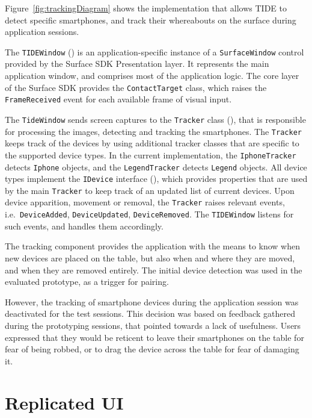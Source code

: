 Figure~\ref{fig:trackingDiagram} shows the implementation that allows TIDE to detect specific smartphones, and track their whereabouts on the surface during application sessions.

The \texttt{TIDEWindow} () is an application-specific instance of a \texttt{SurfaceWindow} control provided by the Surface SDK Presentation layer. 
It represents the main application window, and comprises most of the application logic.
The core layer of the Surface SDK provides the \texttt{ContactTarget} class, which raises the \texttt{FrameReceived} event for each available frame of visual input.

The \texttt{TideWindow} sends screen captures to the \texttt{Tracker} class (), that is responsible for processing the images, detecting and tracking the smartphones.
The \texttt{Tracker} keeps track of the devices by using additional tracker classes that are specific to the supported device types.
In the current implementation, the \texttt{IphoneTracker} detects \texttt{Iphone} objects, and the \texttt{LegendTracker} detects \texttt{Legend} objects.
All device types implement the \texttt{IDevice} interface (), which provides properties that are used by the main \texttt{Tracker} to keep track of an updated list of current devices.
Upon device apparition, movement or removal, the \texttt{Tracker} raises relevant events, i.e.\ \texttt{DeviceAdded}, \texttt{DeviceUpdated}, \texttt{DeviceRemoved}.
The \texttt{TIDEWindow} listens for such events, and handles them accordingly.

The tracking component provides the application with the means to know when new devices are placed on the table, but also when and where they are moved, and when they are removed entirely.
The initial device detection was used in the evaluated prototype, as a trigger for pairing.

However, the tracking of smartphone devices during the application session was deactivated for the test sessions.
This decision was based on feedback gathered during the prototyping sessions, that pointed towards a lack of usefulness.
Users expressed that they would be reticent to leave their smartphones on the table for fear of being robbed, or to drag the device across the table for fear of damaging it.

\section{Replicated UI}
\label{sec:replicatedui}


